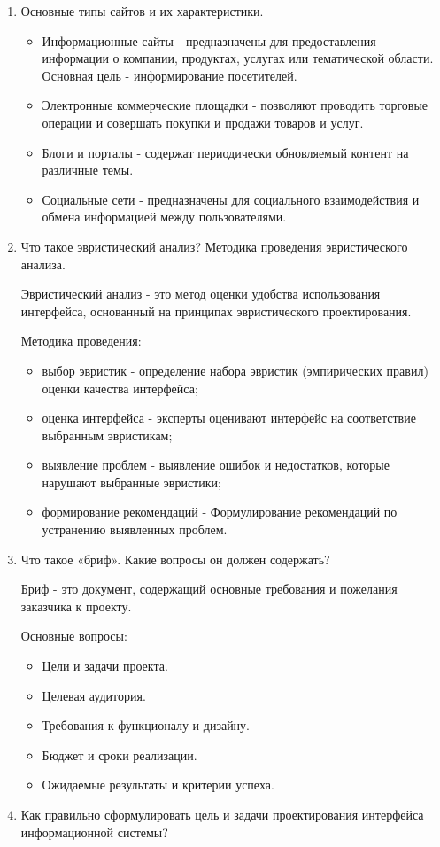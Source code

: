 \begin{enumerate}
    \item Основные типы сайтов и их характеристики.
        \begin{itemize}
            \item Информационные сайты - предназначены для предоставления информации о компании, продуктах, услугах или тематической области. Основная цель - информирование посетителей.
            \item Электронные коммерческие площадки - позволяют проводить торговые операции и совершать покупки и продажи товаров и услуг.
            \item Блоги и порталы - содержат периодически обновляемый контент на различные темы.
            \item Социальные сети - предназначены для социального взаимодействия и обмена информацией между пользователями.
        \end{itemize}
    \item Что такое эвристический анализ? Методика проведения эвристического анализа.

        Эвристический анализ - это метод оценки удобства использования интерфейса, основанный на принципах эвристического проектирования.

        Методика проведения:
        \begin{itemize}
            \item выбор эвристик - определение набора эвристик (эмпирических правил) оценки качества интерфейса;
            \item оценка интерфейса - эксперты оценивают интерфейс на соответствие выбранным эвристикам;
            \item выявление проблем - выявление ошибок и недостатков, которые нарушают выбранные эвристики;
            \item формирование рекомендаций - Формулирование рекомендаций по устранению выявленных проблем.
        \end{itemize}
    \item Что такое «бриф». Какие вопросы он должен содержать?

        Бриф - это документ, содержащий основные требования и пожелания заказчика к проекту.

        Основные вопросы:
        \begin{itemize}
            \item Цели и задачи проекта.
            \item Целевая аудитория.
            \item Требования к функционалу и дизайну.
            \item Бюджет и сроки реализации.
            \item Ожидаемые результаты и критерии успеха.
        \end{itemize}
    \item Как правильно сформулировать цель и задачи проектирования интерфейса информационной системы?


\end{enumerate}
